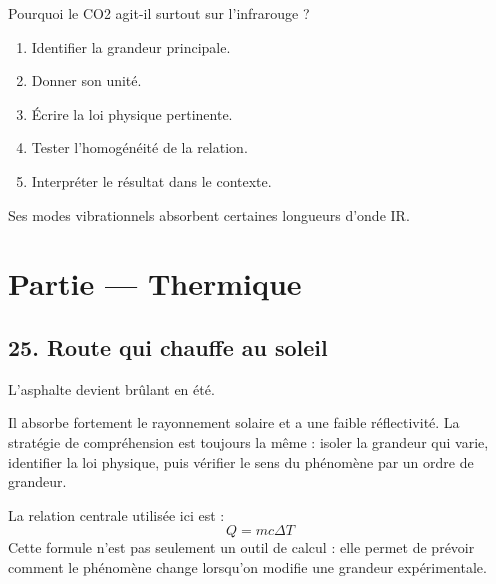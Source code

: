 \documentclass[11pt,a4paper]{article}
\begin{document}
\begin{exercicebox}
Pourquoi le CO2 agit-il surtout sur l'infrarouge ?
\begin{enumerate}
  \item Identifier la grandeur principale.
  \item Donner son unité.
  \item Écrire la loi physique pertinente.
  \item Tester l'homogénéité de la relation.
  \item Interpréter le résultat dans le contexte.
\end{enumerate}
\end{exercicebox}

\begin{corrigebox}[Indication]
Ses modes vibrationnels absorbent certaines longueurs d'onde IR.
\end{corrigebox}


\section{Partie — Thermique}


\subsection{25. Route qui chauffe au soleil}

\begin{exemplebox}
L'asphalte devient brûlant en été.
\end{exemplebox}

\begin{methodebox}
Il absorbe fortement le rayonnement solaire et a une faible réflectivité.
La stratégie de compréhension est toujours la même : isoler la grandeur qui varie, identifier la loi physique, puis vérifier le sens du phénomène par un ordre de grandeur.
\end{methodebox}

\begin{theorembox}
La relation centrale utilisée ici est :
\[
Q=mc\Delta T
\]
Cette formule n'est pas seulement un outil de calcul : elle permet de prévoir comment le phénomène change lorsqu'on modifie une grandeur expérimentale.
\end{theorembox}
\end{document}
